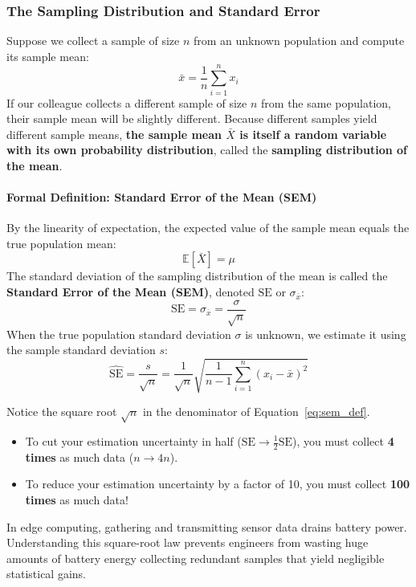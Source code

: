 \subsubsection{The Sampling Distribution and Standard Error}
Suppose we collect a sample of size $n$ from an unknown population and compute its sample mean:
\begin{equation}
\bar{x} = \frac{1}{n} \sum_{i=1}^{n} x_i\label{eq:sample_mean_def}
\end{equation}
If our colleague collects a different sample of size $n$ from the same population, their sample mean will be slightly different. Because different samples yield different sample means, \textbf{the sample mean $\bar{X}$ is itself a random variable with its own probability distribution}, called the \textbf{sampling distribution of the mean}.

\paragraph{Formal Definition: Standard Error of the Mean (SEM)}
By the linearity of expectation, the expected value of the sample mean equals the true population mean:
\begin{equation}
\mathbb{E}[\bar{X}] = \mu
\end{equation}
The standard deviation of the sampling distribution of the mean is called the \textbf{Standard Error of the Mean (SEM)}, denoted $\text{SE}$ or $\sigma_{\bar{x}}$:
\begin{equation}
\text{SE} = \sigma_{\bar{x}} = \frac{\sigma}{\sqrt{n}}\label{eq:sem_def}
\end{equation}
When the true population standard deviation $\sigma$ is unknown, we estimate it using the sample standard deviation $s$:
\begin{equation}
\widehat{\text{SE}} = \frac{s}{\sqrt{n}} = \frac{1}{\sqrt{n}} \sqrt{\frac{1}{n - 1} \sum_{i=1}^{n} (x_i - \bar{x})^2}\label{eq:sem_sample_def}
\end{equation}

\begin{keyidea}
Notice the square root $\sqrt{n}$ in the denominator of Equation~\eqref{eq:sem_def}. 
\begin{itemize}
    \item To cut your estimation uncertainty in half ($\text{SE} \to \frac{1}{2}\text{SE}$), you must collect \textbf{4 times} as much data ($n \to 4n$).
    \item To reduce your estimation uncertainty by a factor of 10, you must collect \textbf{100 times} as much data!
\end{itemize}
In edge computing, gathering and transmitting sensor data drains battery power. Understanding this square-root law prevents engineers from wasting huge amounts of battery energy collecting redundant samples that yield negligible statistical gains.
\end{keyidea}

